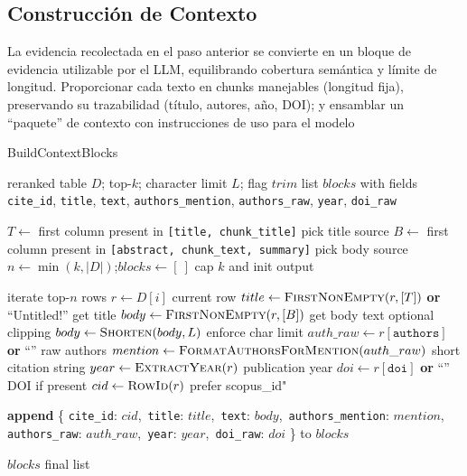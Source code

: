\subsection{Construcción de Contexto}
La evidencia recolectada en el paso anterior se convierte en un bloque de evidencia utilizable por el LLM, equilibrando cobertura semántica y límite de longitud. 
Proporcionar cada texto en chunks manejables (longitud fija), preservando su trazabilidad (título, autores, año, DOI); y ensamblar un “paquete” de contexto con instrucciones de uso para el modelo
\begin{algorithmEN}[H]
\caption{BuildContextBlocks}
\begin{algorithmic}[1]
\Require reranked table $D$; top-$k$; character limit $L$; flag $trim$
\Ensure list $blocks$ with fields \texttt{cite\_id}, \texttt{title}, \texttt{text}, \texttt{authors\_mention}, \texttt{authors\_raw}, \texttt{year}, \texttt{doi\_raw}

\State $T \gets$ first column present in \texttt{[title, chunk\_title]} \Comment pick title source
\State $B \gets$ first column present in \texttt{[abstract, chunk\_text, summary]} \Comment pick body source
\State $n \gets \min(k, |D|)$;\quad $blocks \gets [\ ]$ \Comment cap $k$ and init output

 \Comment iterate top-$n$ rows
  \State $r \gets D[i]$ \Comment current row
  \State $title \gets \textsc{FirstNonEmpty}(r,[T])$ \textbf{or} ``\!Untitled!'' \Comment get title
  \State $body \gets \textsc{FirstNonEmpty}(r,[B])$ \Comment get body text
   \Comment optional clipping
    \State $body \gets \textsc{Shorten}(body, L)$ \Comment enforce char limit
  \EndIf
  \State $auth\_raw \gets r[\texttt{authors}]$ \textbf{or} ``'' \Comment raw authors
  \State $mention \gets \textsc{FormatAuthorsForMention}(auth\_raw)$ \Comment short citation string
  \State $year \gets \textsc{ExtractYear}(r)$ \Comment publication year
  \State $doi \gets r[\texttt{doi}]$ \textbf{or} ``'' \Comment DOI if present
  \State $cid \gets \textsc{RowId}(r)$ \Comment prefer scopus\_id"

  \State \textbf{append} \{
    \texttt{cite\_id}: $cid$,\,
    \texttt{title}: $title$,\,
    \texttt{text}: $body$,\,
    \texttt{authors\_mention}: $mention$,\,
    \texttt{authors\_raw}: $auth\_raw$,\,
    \texttt{year}: $year$,\,
    \texttt{doi\_raw}: $doi$
  \} to $blocks$ 
\EndFor

\State \Return $blocks$ \Comment final list
\end{algorithmic}
\end{algorithmEN}

